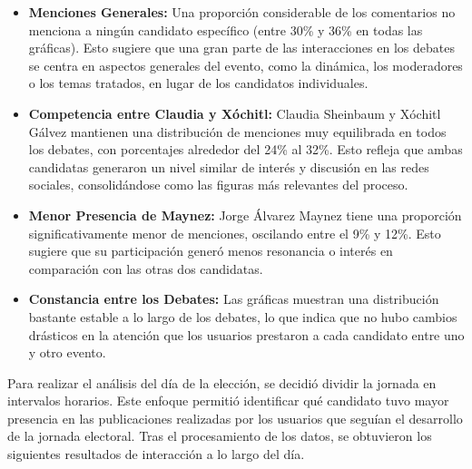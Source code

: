 \documentclass[10pt, a4paper]{article}
\begin{document}
	\begin{itemize}
		\item \textbf{Menciones Generales:} Una proporción considerable de los comentarios no menciona a ningún candidato específico (entre 30\% y 36\% en todas las gráficas). Esto sugiere que una gran parte de las interacciones en los debates se centra en aspectos generales del evento, como la dinámica, los moderadores o los temas tratados, en lugar de los candidatos individuales.
		
		\item \textbf{Competencia entre Claudia y Xóchitl:} Claudia Sheinbaum y Xóchitl Gálvez mantienen una distribución de menciones muy equilibrada en todos los debates, con porcentajes alrededor del 24\% al 32\%. Esto refleja que ambas candidatas generaron un nivel similar de interés y discusión en las redes sociales, consolidándose como las figuras más relevantes del proceso.
		
		\item \textbf{Menor Presencia de Maynez:} Jorge Álvarez Maynez tiene una proporción significativamente menor de menciones, oscilando entre el 9\% y 12\%. Esto sugiere que su participación generó menos resonancia o interés en comparación con las otras dos candidatas.
		
		\item \textbf{Constancia entre los Debates:} Las gráficas muestran una distribución bastante estable a lo largo de los debates, lo que indica que no hubo cambios drásticos en la atención que los usuarios prestaron a cada candidato entre uno y otro evento.
	\end{itemize}

	Para realizar el análisis del día de la elección, se decidió dividir la jornada en intervalos horarios. Este enfoque permitió identificar qué candidato tuvo mayor presencia en las publicaciones realizadas por los usuarios que seguían el desarrollo de la jornada electoral. Tras el procesamiento de los datos, se obtuvieron los siguientes resultados de interacción a lo largo del día.
	
\end{document}
